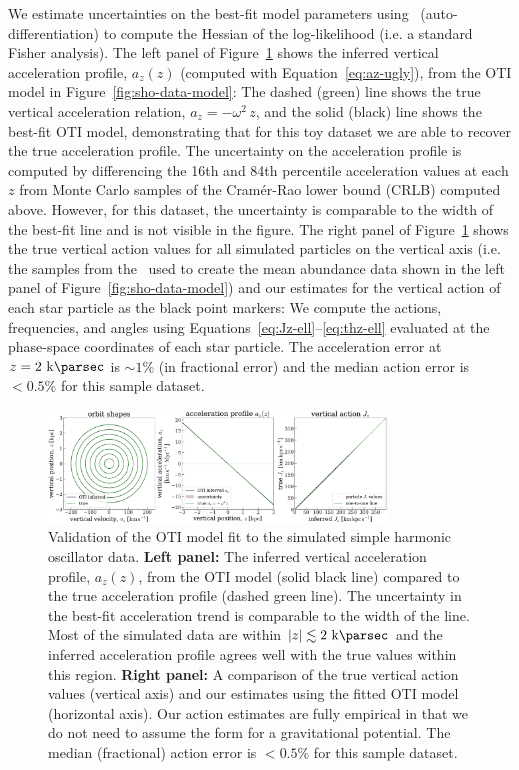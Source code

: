We estimate uncertainties on the best-fit model parameters using \jax\
(auto-differentiation) to compute the Hessian of the log-likelihood (i.e. a standard
Fisher analysis).
The left panel of Figure~\ref{fig:sho-validation} shows the inferred vertical
acceleration profile, $a_z(z)$ (computed with Equation~\ref{eq:az-ugly}), from the OTI
model in Figure~\ref{fig:sho-data-model}:
The dashed (green) line shows the true vertical acceleration relation, $a_z = -\omega^2
\, z$, and the solid (black) line shows the best-fit OTI model, demonstrating that for
this toy dataset we are able to recover the true acceleration profile.
The uncertainty on the acceleration profile is computed by differencing the 16th and
84th percentile acceleration values at each $z$ from Monte Carlo samples of the
Cram\'er-Rao lower bound (CRLB) computed above.
However, for this dataset, the uncertainty is comparable to the width of the best-fit
line and is not visible in the figure.
The right panel of Figure~\ref{fig:sho-validation} shows the true vertical action values
for all simulated particles on the vertical axis (i.e. the samples from the \df\ used to
create the mean abundance data shown in the left panel of
Figure~\ref{fig:sho-data-model}) and our estimates for the vertical action of each star
particle as the black point markers:
We compute the actions, frequencies, and angles using
Equations~\ref{eq:Jz-ell}--\ref{eq:thz-ell} evaluated at the phase-space coordinates of
each star particle.
The acceleration error at $z=2~\kpc$ is $\sim 1\%$ (in fractional error) and the median
action error is $<0.5\%$ for this sample dataset.

\begin{figure}[t!]
\begin{center}
\includegraphics[width=0.8\textwidth]{sho-validation.pdf}
\end{center}
\caption{%
Validation of the OTI model fit to the simulated simple harmonic oscillator data.
\textbf{Left panel:} The inferred vertical acceleration profile, $a_z(z)$, from the OTI
model (solid black line) compared to the true acceleration profile (dashed green line).
The uncertainty in the best-fit acceleration trend is comparable to the width of the
line.
Most of the simulated data are within $|z| \lesssim 2~\kpc$ and the inferred
acceleration profile agrees well with the true values within this region.
\textbf{Right panel:} A comparison of the true vertical action values (vertical axis)
and our estimates using the fitted OTI model (horizontal axis).
Our action estimates are fully empirical in that we do not need to assume the form for a
gravitational potential.
The median (fractional) action error is $<0.5\%$ for this sample dataset.
\label{fig:sho-validation}
}
\end{figure}

